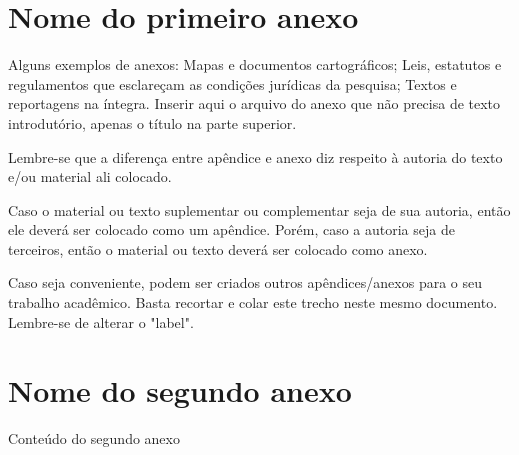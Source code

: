 
\begin{anexosenv}

\chapter{Nome do primeiro anexo} %
\label{chap:anexoA}

Alguns exemplos de anexos: Mapas e documentos cartográficos; Leis, estatutos e regulamentos que esclareçam as condições jurídicas da pesquisa; Textos e reportagens na íntegra. Inserir aqui o arquivo do anexo que não precisa de texto introdutório, apenas o título na parte superior. 

Lembre-se que a diferença entre apêndice e anexo diz respeito à autoria do texto e/ou material ali colocado.

Caso o material ou texto suplementar ou complementar seja de sua autoria, então ele deverá ser colocado como um apêndice. Porém, caso a autoria seja de terceiros, então o material ou texto deverá ser colocado como anexo.

Caso seja conveniente, podem ser criados outros apêndices/anexos para o seu trabalho acadêmico. Basta recortar e colar este trecho neste mesmo documento. Lembre-se de alterar o "label".

\chapter{Nome do segundo anexo}
\label{chap:anexoB}

Conteúdo do segundo anexo

\end{anexosenv}